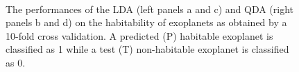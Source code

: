 \documentclass[
12pt, %
a4paper, %
oneside, %
headinclude,footinclude, %
BCOR5mm, %
]{scrartcl}
\begin{document}
\begin{figure}[h]
  \centering
{}
\\
\caption{The performances of the LDA (left panels a and c) and QDA (right panels b and d) on the habitability of exoplanets as obtained by a 10-fold cross validation.  A predicted (P) habitable exoplanet is classified as 1 while a test (T) non-habitable exoplanet is classified as 0.}
\label{LDA+QDA_results}
\end{figure}
\end{document}

